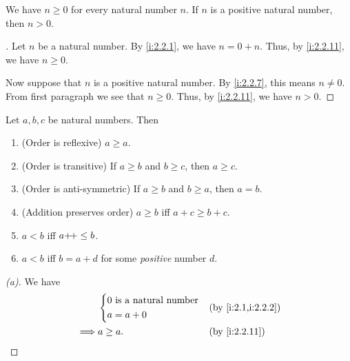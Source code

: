 \begin{ac}\label{i:ac:2.2.4}
  We have \(n \geq 0\) for every natural number \(n\).
  If \(n\) is a positive natural number, then \(n > 0\).
\end{ac}

\begin{proof}[]
  Let \(n\) be a natural number.
  By \cref{i:2.2.1}, we have \(n = 0 + n\).
  Thus, by \cref{i:2.2.11}, we have \(n \geq 0\).

  Now suppose that \(n\) is a positive natural number.
  By \cref{i:2.2.7}, this means \(n \neq 0\).
  From first paragraph we see that \(n \geq 0\).
  Thus, by \cref{i:2.2.11}, we have \(n > 0\).
\end{proof}

\begin{prop}\label{i:2.2.12}
  Let \(a, b, c\) be natural numbers.
  Then
  \begin{enumerate}
    \item (Order is reflexive) \(a \geq a\).
    \item (Order is transitive) If \(a \geq b\) and \(b \geq c\), then \(a \geq c\).
    \item (Order is anti-symmetric) If \(a \geq b\) and \(b \geq a\), then \(a = b\).
    \item (Addition preserves order) \(a \geq b\) iff \(a + c \geq b + c\).
    \item \(a < b\) iff \(a{+}\!{+} \leq b\).
    \item \(a < b\) iff \(b = a + d\) for some \emph{positive} number \(d\).
  \end{enumerate}
\end{prop}

\begin{proof}[(a)]
  We have
  \begin{align*}
             & \begin{dcases}
                 0 \text{ is a natural number} \\
                 a = a + 0
               \end{dcases} &  & \by{i:2.1,i:2.2.2}                \\
    \implies & a \geq a.                        &  & \by{i:2.2.11}
  \end{align*}
\end{proof}

